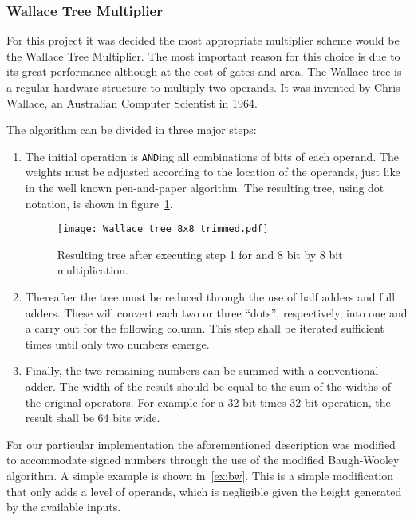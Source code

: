 \subsubsection{Wallace Tree Multiplier}
\label{sec:wallace}

For this project it was decided the most appropriate multiplier scheme would be the Wallace Tree Multiplier. The most important reason for this choice is due to its great performance although at the cost of gates and area.
The Wallace tree is a regular hardware structure to multiply two operands. It was invented by Chris Wallace, an Australian Computer Scientist in 1964.

The algorithm can be divided in three major steps:
\begin{enumerate}
\item The initial operation is \texttt{AND}ing all combinations of bits of each operand. The weights must be adjusted according to the location of the operands, just like in the well known pen-and-paper algorithm. The resulting tree, using dot notation, is shown in figure~\ref{fig:wallace_tree}.

\begin{figure}[H]
\centering
\texttt{[image: Wallace\_tree\_8x8\_trimmed.pdf]}
\caption{Resulting tree after executing step 1 for and 8 bit by 8 bit multiplication.}
\label{fig:wallace_tree}
\end{figure}

\item Thereafter the tree must be reduced through the use of half adders and full adders. These will convert each two or three ``dots'', respectively, into one and a carry out for the following column. This step shall be iterated sufficient times until only two numbers emerge.

\item Finally, the two remaining numbers can be summed with a conventional adder. The width of the result should be equal to the sum of the widths of the original operators. For example for a 32 bit times 32 bit operation, the result shall be 64 bits wide. 
\end{enumerate}  

For our particular implementation the aforementioned description was modified to accommodate signed numbers through the use of the modified Baugh-Wooley algorithm. A simple example is shown in~\ref{ex:bw}. This is a simple modification that only adds a level of operands, which is negligible given the height generated by the available inputs. 

